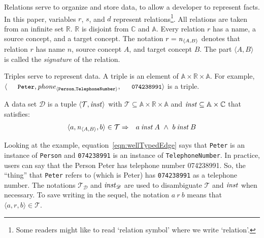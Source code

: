 \documentclass[runningheads]{llncs}
\newcommand{\id}[1]{\text{\it #1\/}}
\newcommand{\instance}{\mathbin{\id{inst}}}
\newcommand{\declare}[3]{\id{#1}_{\pair{#2}{#3}}}
\newcommand{\pair}[2]{\langle{#1},{#2}\rangle}
\newcommand{\Pair}[2]{#1\times#2}
\newcommand{\triple}[3]{\langle{#1},{#2},{#3}\rangle}
\newcommand{\atom}[1]{{\tt\small #1}}
\newcommand{\Atoms}{\mathbb{A}}
\newcommand{\Concepts}{\mathbb{C}}
\newcommand{\Rels}{\mathbb{R}}   %
\newcommand{\triples}{\mathcal{T}}
\newcommand{\Triple}[3]{#1\times#2\times#3}
\newcommand{\dataset}{\mathscr{D}}
\begin{document}
   Relations serve to organize and store data, to allow a developer to represent facts.
   In this paper, variables $r$, $s$, and $d$ represent relations\footnote{Some readers might like to read `relation symbol' where we write `relation'.}.
   All relations are taken from an infinite set $\Rels$.
   $\Rels$ is disjoint from $\Concepts$ and $\Atoms$.
   Every relation $r$ has a name, a source concept, and a target concept.
   The notation $r=\declare{n}{A}{B}$ denotes that relation $r$ has name $n$, source concept $A$, and target concept $B$.
   The part $\pair{A}{B}$ is called the {\em signature} of the relation.
   
   Triples serve to represent data.
   A triple %
   is an element of $\Triple{\Atoms}{\Rels}{\Atoms}$.
   For example, $\triple{\text{\atom{Peter}}}{\declare{\id{phone}}{\tt Person}{\tt TelephoneNumber}}{\text{\atom{074238991}}}$ is a triple.
   
   \begin{definition}
   A data set $\dataset$ is a tuple $\pair{\triples}{\instance}$ with $\triples \subseteq {\Triple{\Atoms}{\Rels}{\Atoms}}$ and $\instance \subseteq  {\Pair{\Atoms}{\Concepts}}$ that satisfies:
\begin{eqnarray}
   \triple{a}{\declare{n}{A}{B}}{b}\in\triples&\Rightarrow&a\instance A\ \wedge\ b\instance B
   \label{eqn:wellTypedEdge}
\end{eqnarray}
\end{definition}
   Looking at the example,
   equation~\ref{eqn:wellTypedEdge} says that \atom{Peter} is an instance of {\tt Person} and \atom{074238991} is an instance of {\tt TelephoneNumber}.
   In practice, users can say that the Person Peter has telephone number 074238991.
   So, the ``thing'' that \atom{Peter} refers to (which is Peter) has \atom{074238991} as a telephone number.
   The notations $\triples_{\dataset}$ and $\instance_{\dataset}$ are used to disambiguate $\triples$ and $\instance$ when necessary.
   To save writing in the sequel, the notation $a\ r\ b$ means that $\triple{a}{r}{b}\in\triples$.
\end{document}
